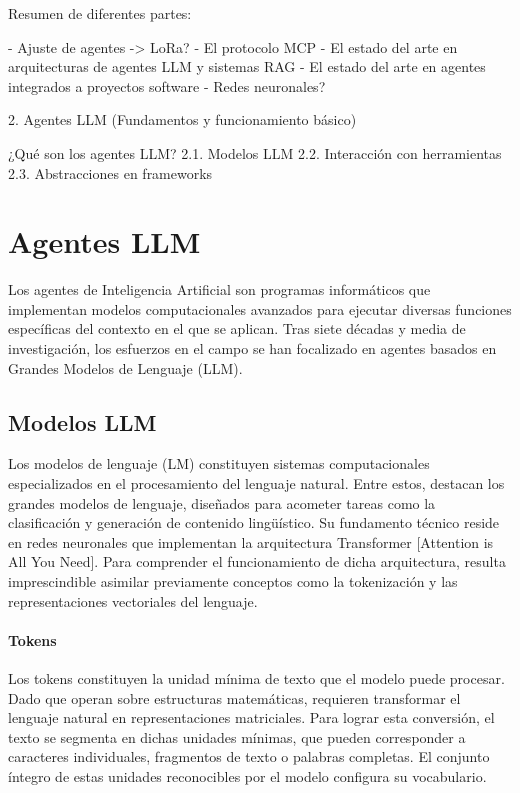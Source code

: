 Resumen de diferentes partes: 

- Ajuste de agentes -> LoRa? 
- El protocolo MCP
- El estado del arte en arquitecturas de agentes LLM y sistemas RAG
- El estado del arte en agentes integrados a proyectos software
- Redes neuronales?

2. Agentes LLM (Fundamentos y funcionamiento básico)

¿Qué son los agentes LLM?
2.1. Modelos LLM
2.2. Interacción con herramientas
2.3. Abstracciones en frameworks

\section{Agentes LLM}

Los agentes de Inteligencia Artificial son programas informáticos que implementan modelos computacionales avanzados para ejecutar diversas funciones específicas del contexto en el que se aplican. Tras siete décadas y media de investigación, los esfuerzos en el campo se han focalizado en agentes basados en Grandes Modelos de Lenguaje (LLM). 

\subsection{Modelos LLM}

Los modelos de lenguaje (LM) constituyen sistemas computacionales especializados en el procesamiento del lenguaje natural. Entre estos, destacan los grandes modelos de lenguaje, diseñados para acometer tareas  como la clasificación y generación de contenido lingüístico. Su fundamento técnico reside en redes neuronales que implementan la arquitectura Transformer [Attention is All You Need]. Para comprender el funcionamiento de dicha arquitectura, resulta imprescindible asimilar previamente conceptos como la tokenización y las representaciones vectoriales del lenguaje.

\paragraph{Tokens}
Los tokens constituyen la unidad mínima de texto que el modelo puede procesar. Dado que operan sobre estructuras matemáticas, requieren transformar el lenguaje natural en representaciones matriciales. Para lograr esta conversión, el texto se segmenta en dichas unidades mínimas, que pueden corresponder a caracteres individuales, fragmentos de texto o palabras completas. El conjunto íntegro de estas unidades reconocibles por el modelo configura su vocabulario. 

